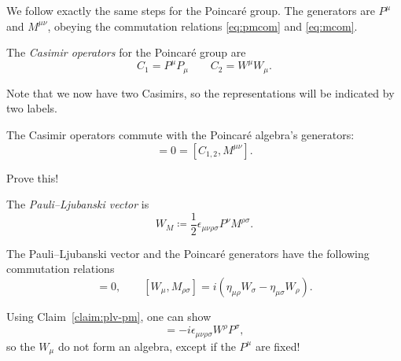 We follow exactly the same steps for the Poincaré group.
The generators are $P^{\mu}$ and $M^{\mu\nu}$, obeying the commutation relations \eqref{eq:pmcom} and \eqref{eq:mcom}.
\begin{definition}
  The \emph{Casimir operators} for the Poincaré group are
  \begin{equation}
    C_1 = P^{\mu} P_{\mu} \qquad C_2 = W^{\mu} W_{\mu}.
  \end{equation}
\end{definition}
\begin{remark}
  Note that we now have two Casimirs, so the representations will be indicated by two labels.
\end{remark}
\begin{claim}
  The Casimir operators commute with the Poincaré algebra's generators:
  \begin{equation}
    [C_{1, 2}, P^{\mu}] = 0 = [C_{1, 2}, M^{\mu\nu}].
  \end{equation}
\end{claim}
\begin{exercise}
  Prove this!
\end{exercise}
\begin{definition}
  The \emph{Pauli--Ljubanski vector} is
  \begin{equation}
    W_M \coloneqq \frac{1}{2} \epsilon_{\mu\nu\rho\sigma} P^{\nu} M^{\rho\sigma}.
  \end{equation}
\end{definition}
\begin{claim}
  \label{claim:plv-pm}
  The Pauli--Ljubanski vector and the Poincaré generators have the following commutation relations
  \begin{equation}
    [W_{\mu}, P_{\nu}] = 0, \qquad
    [W_{\mu}, M_{\rho\sigma}] = i (\eta_{\mu\rho} W_{\sigma} - \eta_{\mu\sigma} W_{\rho}).
  \end{equation}
\end{claim}
\begin{claim}
  Using Claim~\ref{claim:plv-pm}, one can show
  \begin{equation}
    [W_{\mu}, W_{\nu}] = -i \epsilon_{\mu\nu\rho\sigma} W^{\rho} P^{\sigma},
  \end{equation}
  so the $W_{\mu}$ do not form an algebra, except if the $P^{\mu}$ are fixed!
\end{claim}

